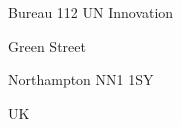 \documentclass[twoside,twocolumn]{article}
\begin{document}
Bureau 112 UN Innovation

Green Street

Northampton NN1 1SY

UK










\end{document}

